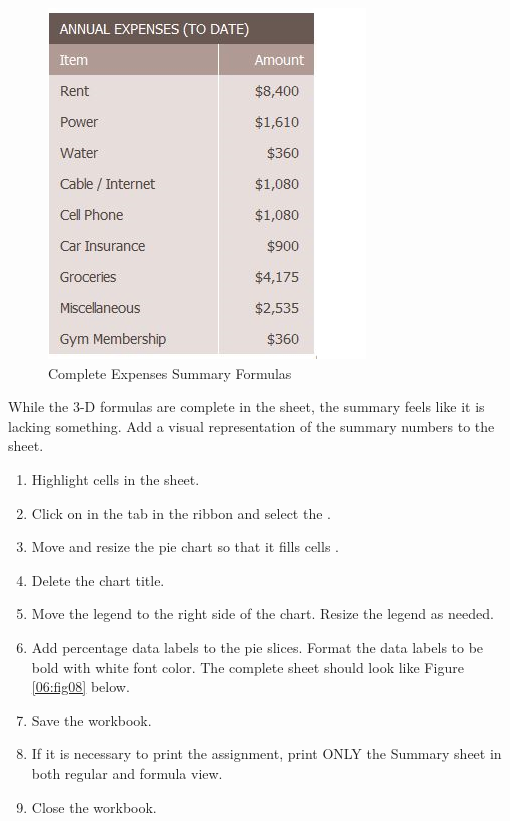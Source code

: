 \begin{figure}[H]
	\centering
	\includegraphics[width=\maxwidth{.95\linewidth}]{gfx/ch06_fig07}
	\caption{Complete Expenses Summary Formulas}
	\label{06:fig07}
\end{figure}

While the 3-D formulas are complete in the  sheet, the summary feels like it is lacking something. Add a visual representation of the summary numbers to the sheet.

\begin{enumerate}
	\item Highlight cells  in the  sheet.
	\item Click on  in the  tab in the ribbon and select the .
	\item Move and resize the pie chart so that it fills cells .
	\item Delete the chart title.
	\item Move the legend to the right side of the chart. Resize the legend as needed.
	\item Add percentage data labels to the pie slices. Format the data labels to be bold with white font color. The complete  sheet should look like Figure \ref{06:fig08} below.
	\item Save the workbook. 
	\item If it is necessary to print the assignment, print ONLY the Summary sheet in both regular and formula view. 
	\item Close the workbook.
\end{enumerate}

